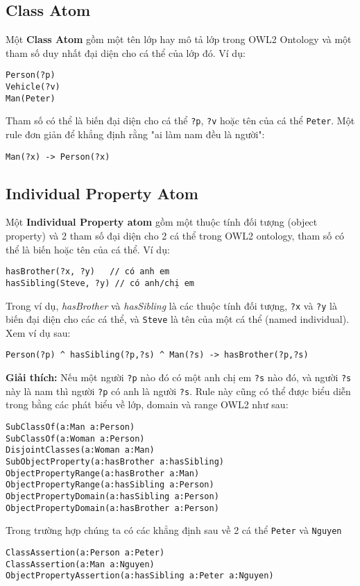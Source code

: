 \subsection{Class Atom}
Một \textbf{Class Atom} gồm một tên lớp hay mô tả lớp trong OWL2 Ontology và một tham số duy nhất đại diện cho cá thể của lớp đó. Ví dụ:
\begin{verbatim}
Person(?p)
Vehicle(?v)
Man(Peter)
\end{verbatim}
Tham số có thể là biến đại diện cho cá thể \verb|?p|, \verb|?v| hoặc tên của cá thể \verb|Peter|.
Một rule đơn giản để khẳng định rằng "ai làm nam đều là người":
\begin{verbatim}
Man(?x) -> Person(?x)
\end{verbatim}
\subsection{Individual Property Atom}
Một \textbf{Individual Property atom} gồm một thuộc tính đối tượng (object property) và 2 tham số đại diện cho 2 cá thể trong OWL2 ontology, tham số có thể là biến hoặc tên của cá thể. Ví dụ:
\begin{verbatim}
hasBrother(?x, ?y)   // có anh em
hasSibling(Steve, ?y) // có anh/chị em 
\end{verbatim}
Trong ví dụ, \textit{hasBrother} và \textit{hasSibling} là các thuộc tính đối tượng, \verb|?x| và \verb|?y| là biến đại diện cho các cá thể, và \verb|Steve| là tên của một cá thể (named individual). Xem ví dụ sau:
\begin{verbatim}
Person(?p) ^ hasSibling(?p,?s) ^ Man(?s) -> hasBrother(?p,?s)
\end{verbatim}
\textbf{Giải thích:} Nếu một người \verb|?p| nào đó có một anh chị em \verb|?s| nào đó, và người \verb|?s| này là nam thì người \verb|?p| có anh là người \verb|?s|. Rule này cũng có thể được biểu diễn trong bằng các phát biểu về lớp, domain và range OWL2 như sau:
\begin{verbatim}
SubClassOf(a:Man a:Person)
SubClassOf(a:Woman a:Person)
DisjointClasses(a:Woman a:Man)
SubObjectProperty(a:hasBrother a:hasSibling)
ObjectPropertyRange(a:hasBrother a:Man)
ObjectPropertyRange(a:hasSibling a:Person)
ObjectPropertyDomain(a:hasSibling a:Person)
ObjectPropertyDomain(a:hasBrother a:Person)
\end{verbatim}
Trong trường hợp chúng ta có các khẳng định sau về 2 cá thể \verb|Peter| và \verb|Nguyen|
\begin{verbatim}
ClassAssertion(a:Person a:Peter)
ClassAssertion(a:Man a:Nguyen)
ObjectPropertyAssertion(a:hasSibling a:Peter a:Nguyen)
\end{verbatim}
